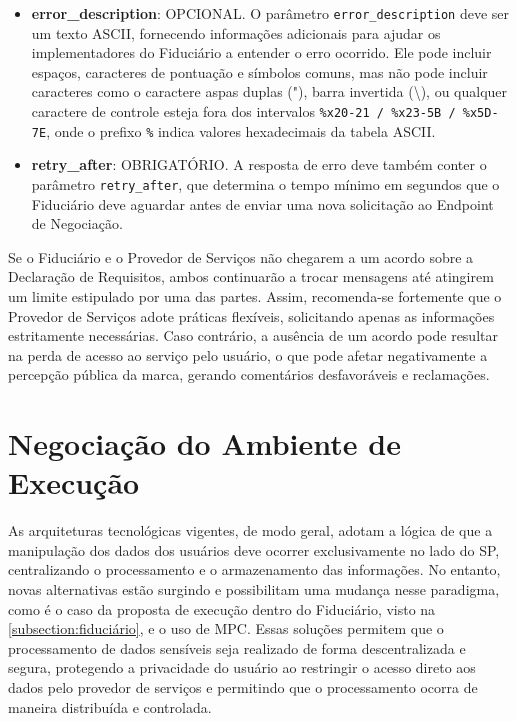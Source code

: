 \begin{itemize}
\begin{itemize}
    \end{itemize}

    \item \textbf{error\_description}: OPCIONAL. O parâmetro \texttt{error\_description} deve ser um texto ASCII, fornecendo informações adicionais para ajudar os implementadores do Fiduciário a entender o erro ocorrido. Ele pode incluir espaços, caracteres de pontuação e símbolos comuns, mas não pode incluir caracteres como o caractere aspas duplas ("), barra invertida (\textbackslash), ou qualquer caractere de controle esteja fora dos intervalos \texttt{\%x20-21 / \%x23-5B / \%x5D-7E}, onde o prefixo \texttt{\%} indica valores hexadecimais da tabela ASCII.

    \item \textbf{retry\_after}: OBRIGATÓRIO. A resposta de erro deve também conter o parâmetro \texttt{retry\_after}, que determina o tempo mínimo em segundos que o Fiduciário deve aguardar antes de enviar uma nova solicitação ao Endpoint de Negociação.
    
\end{itemize}

Se o Fiduciário e o Provedor de Serviços não chegarem a um acordo sobre a Declaração de Requisitos, ambos continuarão a trocar mensagens até atingirem um limite estipulado por uma das partes. Assim, recomenda-se fortemente que o Provedor de Serviços adote práticas flexíveis, solicitando apenas as informações estritamente necessárias. Caso contrário, a ausência de um acordo pode resultar na perda de acesso ao serviço pelo usuário, o que pode afetar negativamente a percepção pública da marca, gerando comentários desfavoráveis e reclamações.

% 

\section{Negociação do Ambiente de Execução}\label{section:env-negotiation}

As arquiteturas tecnológicas vigentes, de modo geral, adotam a lógica de que a manipulação dos dados dos usuários deve ocorrer exclusivamente no lado do \acs{SP}, centralizando o processamento e o armazenamento das informações. No entanto, novas alternativas estão surgindo e possibilitam uma mudança nesse paradigma, como é o caso da proposta de execução dentro do Fiduciário, visto na \autoref{subsection:fiduciário}, e o uso de \acs{MPC}. Essas soluções permitem que o processamento de dados sensíveis seja realizado de forma descentralizada e segura, protegendo a privacidade do usuário ao restringir o acesso direto aos dados pelo provedor de serviços e permitindo que o processamento ocorra de maneira distribuída e controlada. 

